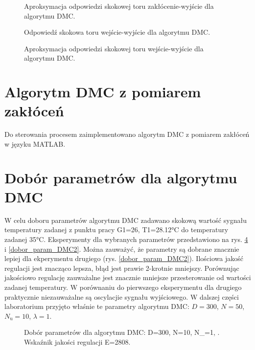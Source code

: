 \documentclass[a4paper,titlepage,11pt,twosides,floatssmall]{mwrep}
\begin{document}
	
\begin{figure}[H]
	\centering
	
	\caption{Aproksymacja odpowiedzi skokowej toru zakłócenie-wyjście dla algorytmu DMC.}
	\label{skok_DMC_zak_apro}
\end{figure}



\begin{figure}[H]
	\centering
	
	\caption{Odpowiedź skokowa toru wejście-wyjście dla algorytmu DMC.}
	\label{skok_DMC}
\end{figure}

	
\begin{figure}[H]
	\centering
	
	\caption{Aproksymacja odpowiedzi skokowej toru wejście-wyjście dla algorytmu DMC.}
	\label{skok_DMC_apro}
\end{figure}

\section{Algorytm DMC z pomiarem zakłóceń}
Do sterowania procesem zaimplementowano algorytm DMC z pomiarem zakłóceń w języku MATLAB.




\section{Dobór parametrów dla algorytmu DMC}
W celu doboru parametrów algorytmu DMC zadawano skokową wartość sygnału temperatury zadanej z punktu pracy G1=26, T1=\num{28.12}°C do temperatury zadanej \num{35}°C. Eksperymenty dla wybranych parametrów przedstawiono na rys. \ref{dobor_param_DMC1} i \ref{dobor_param_DMC2}. Można zauważyć, że parametry są dobrane znacznie lepiej dla ekperymentu drugiego (rys. \ref{dobor_param_DMC2}). Ilościowa jakość regulacji jest znacząco lepsza, błąd jest prawie 2-krotnie mniejszy. Porównując jakościowo regulację zauważalne jest znacznie mniejsze przesterowanie od wartości zadanej temperatury. W porównaniu do pierwszego eksperymentu dla drugiego praktycznie niezauważalne są oscylacjie sygnału wyjściowego. W dalszej części laboratorium przyjęto właśnie te parametry algorytmu DMC: $D=300$, $N=50$, $N_{\mathrm{u}}=10$, $\lambda=1$. 

\begin{figure}[H]
	\centering
	
	\caption{Dobór parametrów dla algorytmu DMC: D=300, N=10, N_{}=1, .\\ Wskaźnik jakości regulacji E=2808.}
	\label{dobor_param_DMC1}
\end{figure}
\end{document}
